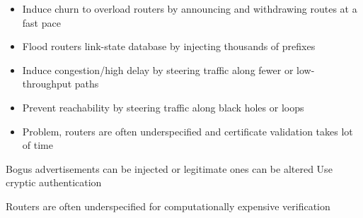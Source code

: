 \begin{itemize}
\begin{itemize}
\begin{itemize}
                    \item Induce churn to overload routers by announcing and withdrawing routes at a fast pace
                    \item Flood routers link-state database by injecting thousands of prefixes
                    \item Induce congestion/high delay by steering traffic along fewer or low-throughput paths
                    \item Prevent reachability by steering traffic along black holes or loops
                \end{itemize}
                    \begin{itemize}
                        \item Problem, routers are often underspecified and certificate validation takes lot of time
                    \end{itemize}
        \end{itemize}
     Bogus advertisements can be injected or legitimate ones can be altered
     Use cryptic authentication
        \begin{itemize}
            \icon Routers are often underspecified for computationally  expensive verification
        \end{itemize}
\end{itemize}

